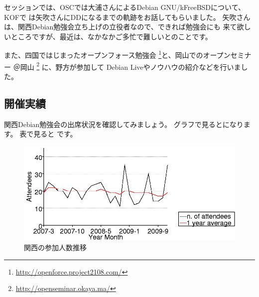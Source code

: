 \documentclass[mingoth,a4paper]{jsarticle}
\begin{document}
セッションでは、OSCでは大浦さんによるDebian GNU/kFreeBSDについて、KOFで
は矢吹さんにDDになるまでの軌跡をお話してもらいました。
矢吹さんは、関西Debian勉強会立ち上げの立役者なので、できれば勉強会にも
来て欲しいところですが、最近は、なかなかご多忙で難しいとのことです。

また、四国ではじまったオープンフォース勉強会 \footnote{
\url{http://openforce.project2108.com/}}と、岡山でのオープンセミナー
＠岡山 \footnote{\url{http://openseminar.okaya.ma/}} に、野方が参加して
Debian Liveやノウハウの紹介などを行いました。

\subsection{開催実績}

関西Debian勉強会の出席状況を確認してみましょう。
グラフで見るとになります。
表で見ると です。

\begin{figure}[h]
 \begin{center}
  \includegraphics[width=1\hsize]{image200912/kansai.png}
 \end{center}
\caption{関西の参加人数推移}
\label{fig:kansaipeoplechart}
\end{figure}
\end{document}

